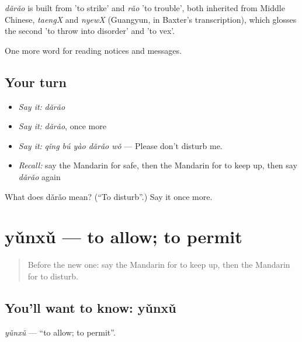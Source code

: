 \begin{cousinweb}
\emph{dǎrǎo} is built from  'to strike' and \emph{rǎo} 'to trouble', both inherited from Middle Chinese, \emph{taengX} and \emph{nyewX} (Guangyun, in Baxter's transcription), which glosses the second 'to throw into disorder' and 'to vex'.
\end{cousinweb}

\begin{grammarlens}[title={What you've built}]
One more word for reading notices and messages.
\end{grammarlens}

\subsection*{Your turn}
\begin{itemize}
\raggedright
  \item \emph{Say it:} \emph{dǎrǎo}
  \item \emph{Say it:} \emph{dǎrǎo}, once more
  \item \emph{Say it:} \emph{qǐng bú yào dǎrǎo wǒ} — Please don't disturb me.
  \item \emph{Recall:} say the Mandarin for safe, then the Mandarin for to keep up, then say \emph{dǎrǎo} again
\end{itemize}

\begin{tcolorbox}[breakable,colback=teal!4,colframe=teal!35!black,title={Before you move on}]
What does dǎrǎo mean? (\textquotedblleft{}To disturb\textquotedblright{}.) Say it once more.
\end{tcolorbox}
\section[yǔnxǔ]{yǔnxǔ — to allow; to permit}

\label{lesson:ZH-C209-yunxu}



\begin{quote}
Before the new one: say the Mandarin for to keep up, then the Mandarin for to disturb.
\end{quote}

\subsection*{You'll want to know: yǔnxǔ}
\emph{yǔnxǔ} — \textquotedblleft{}to allow; to permit\textquotedblright{}.

